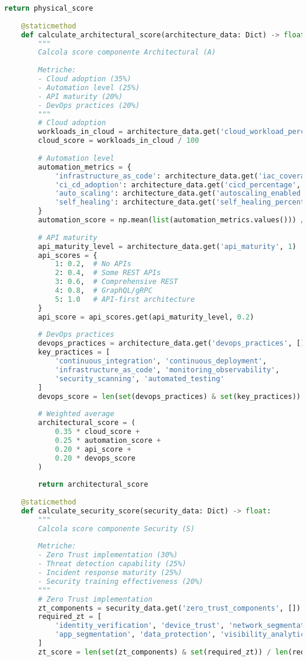 \begin{lstlisting}[language=Python, caption=Calcolo Score Componenti GIST]
        return physical_score
    
    @staticmethod
    def calculate_architectural_score(architecture_data: Dict) -> float:
        """
        Calcola score componente Architectural (A)
        
        Metriche:
        - Cloud adoption (35%)
        - Automation level (25%)
        - API maturity (20%)
        - DevOps practices (20%)
        """
        # Cloud adoption
        workloads_in_cloud = architecture_data.get('cloud_workload_percentage', 0)
        cloud_score = workloads_in_cloud / 100
        
        # Automation level
        automation_metrics = {
            'infrastructure_as_code': architecture_data.get('iac_coverage', 0),
            'ci_cd_adoption': architecture_data.get('cicd_percentage', 0),
            'auto_scaling': architecture_data.get('autoscaling_enabled', 0),
            'self_healing': architecture_data.get('self_healing_percentage', 0)
        }
        automation_score = np.mean(list(automation_metrics.values())) / 100
        
        # API maturity
        api_maturity_level = architecture_data.get('api_maturity', 1)
        api_scores = {
            1: 0.2,  # No APIs
            2: 0.4,  # Some REST APIs
            3: 0.6,  # Comprehensive REST
            4: 0.8,  # GraphQL/gRPC
            5: 1.0   # API-first architecture
        }
        api_score = api_scores.get(api_maturity_level, 0.2)
        
        # DevOps practices
        devops_practices = architecture_data.get('devops_practices', [])
        key_practices = [
            'continuous_integration', 'continuous_deployment',
            'infrastructure_as_code', 'monitoring_observability',
            'security_scanning', 'automated_testing'
        ]
        devops_score = len(set(devops_practices) & set(key_practices)) / len(key_practices)
        
        # Weighted average
        architectural_score = (
            0.35 * cloud_score +
            0.25 * automation_score +
            0.20 * api_score +
            0.20 * devops_score
        )
        
        return architectural_score
    
    @staticmethod
    def calculate_security_score(security_data: Dict) -> float:
        """
        Calcola score componente Security (S)
        
        Metriche:
        - Zero Trust implementation (30%)
        - Threat detection capability (25%)
        - Incident response maturity (25%)
        - Security training effectiveness (20%)
        """
        # Zero Trust implementation
        zt_components = security_data.get('zero_trust_components', [])
        required_zt = [
            'identity_verification', 'device_trust', 'network_segmentation',
            'app_segmentation', 'data_protection', 'visibility_analytics'
        ]
        zt_score = len(set(zt_components) & set(required_zt)) / len(required_zt)
        

\end{lstlisting}
